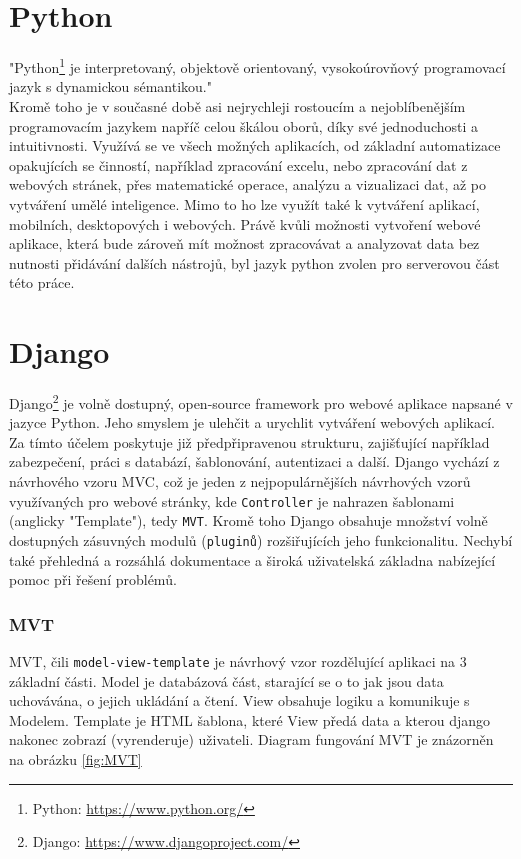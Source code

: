 \section{Python}
"Python\footnote{Python: \url{https://www.python.org/}} je interpretovaný, objektově orientovaný, vysokoúrovňový programovací jazyk s dynamickou sémantikou." \cite{PYTHON} \\
Kromě toho je v současné době asi nejrychleji rostoucím a nejoblíbenějším programovacím jazykem napříč celou škálou oborů, díky své jednoduchosti a intuitivnosti. Využívá se ve všech možných aplikacích, od základní automatizace opakujících se činností, například zpracování excelu, nebo zpracování dat z webových stránek, přes matematické operace, analýzu a vizualizaci dat, až po vytváření umělé inteligence. Mimo to ho lze využít také k vytváření aplikací, mobilních, desktopových i webových. Právě kvůli možnosti vytvoření webové aplikace, která bude zároveň mít možnost zpracovávat a analyzovat data bez nutnosti přidávání dalších nástrojů, byl jazyk python zvolen pro serverovou část této práce.

\section{Django}
Django\footnote{Django: \url{https://www.djangoproject.com/}} je volně dostupný, open-source framework pro webové aplikace napsané v jazyce Python. Jeho smyslem je ulehčit a urychlit vytváření webových aplikací. Za tímto účelem poskytuje již předpřipravenou strukturu, zajišťující například zabezpečení, práci s databází, šablonování, autentizaci a další. Django vychází z návrhového vzoru MVC, což je jeden z nejpopulárnějších návrhových vzorů využívaných pro webové stránky, kde \texttt{Controller} je nahrazen šablonami (anglicky "Template"), tedy \texttt{MVT}. Kromě toho Django obsahuje množství volně dostupných zásuvných modulů (\texttt{pluginů}) rozšiřujících jeho funkcionalitu. Nechybí také přehledná a rozsáhlá dokumentace a široká uživatelská základna nabízející pomoc při řešení problémů.

\subsubsection{MVT}
MVT, čili \texttt{model-view-template} je návrhový vzor rozdělující aplikaci na 3 základní části. Model je databázová část, starající se o to jak jsou data uchovávána, o jejich ukládání a čtení. View obsahuje logiku a komunikuje s Modelem. Template je HTML šablona, které View předá data a kterou django nakonec zobrazí (vyrenderuje) uživateli. Diagram fungování MVT je znázorněn na obrázku \ref{fig:MVT}

